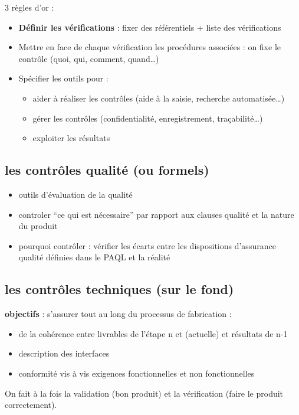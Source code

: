 3 règles d’or :
\begin{itemize}
	\item \textbf{Définir les vérifications} : fixer des référentiels + liste des vérifications
	\item Mettre en face de chaque vérification les procédures associées : on fixe le contrôle (quoi, qui, comment, quand\ldots)
	\item Spécifier les outils pour : 
	\begin{itemize}
		\item aider à réaliser les contrôles (aide à la saisie, recherche automatisée\ldots) 
		\item gérer les contrôles (confidentialité, enregistrement, traçabilité\ldots)
		\item exploiter les résultats
	\end{itemize}
\end{itemize}

	\subsection{les contrôles qualité (ou formels)}

	\begin{itemize}
		\item outils d’évaluation de la qualité
		\item controler “ce qui est nécessaire” par rapport aux clauses qualité et la nature du produit
		\item pourquoi contrôler : vérifier les écarts entre les dispositions d’assurance qualité définies dans le PAQL et la réalité
	\end{itemize}

	\subsection{les contrôles techniques (sur le fond)}
	\textbf{objectifs} : s’assurer tout au long du processus de fabrication :
	\begin{itemize}
		\item de la cohérence entre livrables de l’étape n et (actuelle) et résultats de n-1
		\item description des interfaces
		\item conformité vis à vis exigences fonctionnelles et non fonctionnelles
	\end{itemize}

On fait à la fois la validation (bon produit) et la vérification (faire le produit correctement).

